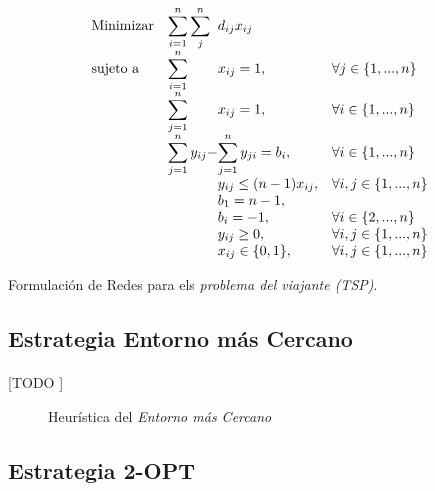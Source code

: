\documentclass[spanish]{article}
\begin{document}
				\begin{eqfloat}
					\begin{equation}
						\begin{array}{ll@{}ll}
							\text{Minimizar}	& \displaystyle\sum\limits_{i = 1}^{n}\sum\limits_{j}^{n} & d_{ij}x_{ij} &\\
							\text{sujeto a}		& \displaystyle\sum\limits_{i = 1}^{n}	&	x_{ij} 	= 1,  & \forall j \in \{1,...,n\}\\
																& \displaystyle\sum\limits_{j = 1}^{n}	&	x_{ij} 	= 1,  & \forall i \in \{1,...,n\}\\
																& \displaystyle\sum\limits_{j = 1}^n	y_{ij} - &\displaystyle\sum\limits_{j = 1}^n	y_{ji} = b_{i},  & \forall i \in \{1,...,n\} \\
																&                               &	y_{ij}  \leq (n-1)x_{ij}, 	&  \forall i,j \in \{1,...,n\}\\
																&                               &	b_{1}  = n - 1, 	& \\
																&                               &	b_{i} = -1, 		& \forall i \in \{2,...,n\} \\
																&                               &	y_{ij} \geq 0, 		& \forall i,j \in \{1,...,n\} \\
																&                               &	x_{ij} \in \{0,1\}, 	& \forall i,j \in \{1,...,n\}
						\end{array}
					\end{equation}
					\caption{Formulación de Redes para els \emph{problema del viajante (TSP)}.}
					\label{eq:tsp_redes}
				\end{eqfloat}


		\subsection{Estrategia Entorno más Cercano}

			\paragraph{}
			[TODO ]

			\begin{figure}
	      \centering
	      \caption{Heurística del \emph{Entorno más Cercano}}
	      \label{code:tsp-greedy}
	    \end{figure}

		\subsection{Estrategia 2-OPT}
\end{document}
